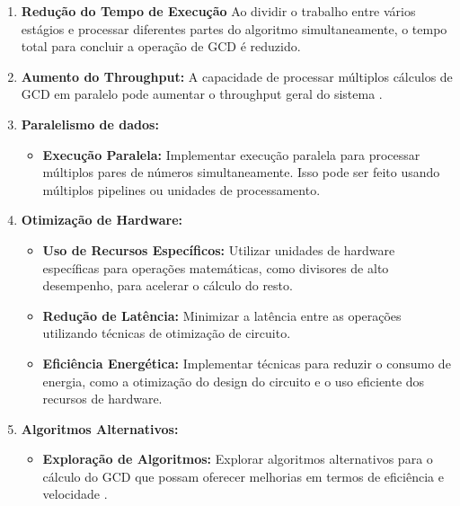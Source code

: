 \documentclass[a4paper,11pt]{article} %
\begin{document}
\begin{enumerate}
    \item \textbf{Redução do Tempo de Execução} Ao dividir o trabalho entre vários estágios e processar diferentes partes do algoritmo simultaneamente, o tempo total para concluir a operação de GCD é reduzido.
    \item \textbf{Aumento do Throughput:} A capacidade de processar múltiplos cálculos de GCD em paralelo pode aumentar o throughput geral do sistema \cite{Harris2010}.
    \item \textbf{Paralelismo de dados:}
        \begin{itemize}
            \item \textbf{Execução Paralela:} Implementar execução paralela para processar múltiplos pares de números simultaneamente. Isso pode ser feito usando múltiplos pipelines ou unidades de processamento.
        \end{itemize}
        \item \textbf{Otimização de Hardware:} 
            \begin{itemize}
                \item \textbf{Uso de Recursos Específicos:} Utilizar unidades de hardware específicas para operações matemáticas, como divisores de alto desempenho, para acelerar o cálculo do resto.
                \item \textbf{Redução de Latência:} Minimizar a latência entre as operações utilizando técnicas de otimização de circuito.
                \item \textbf{Eficiência Energética:} Implementar técnicas para reduzir o consumo de energia, como a otimização do design do circuito e o uso eficiente dos recursos de hardware.
            \end{itemize}
    \item \textbf{Algoritmos Alternativos:}
        \begin{itemize}
            \item \textbf{Exploração de Algoritmos:} Explorar algoritmos alternativos para o cálculo do GCD que possam oferecer melhorias em termos de eficiência e velocidade \cite{Skiena2008}.
        \end{itemize}
\end{enumerate}

\end{document}
